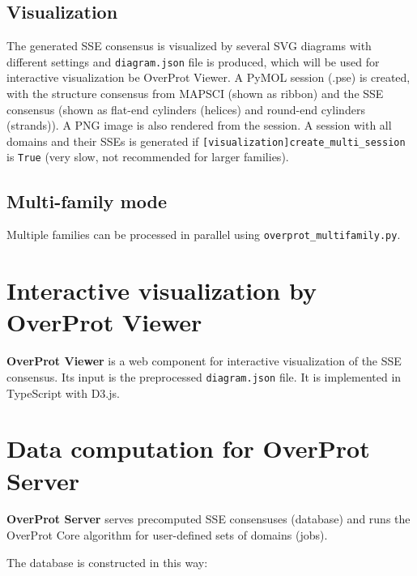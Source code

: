\documentclass[12pt,draft]{article}
\let\oldtexttt\texttt
\renewcommand{\texttt}[1]{\textcolor{CodeColor}{\oldtexttt{#1}}}
\begin{document}
\hypertarget{visualization}{%
\subsection{Visualization}\label{visualization}}

The generated SSE consensus is visualized by several SVG diagrams with
different settings and \texttt{diagram.json} file is produced, which
will be used for interactive visualization be OverProt Viewer. A PyMOL
session (.pse) is created, with the structure consensus from MAPSCI
(shown as ribbon) and the SSE consensus (shown as flat-end cylinders
(helices) and round-end cylinders (strands)). A PNG image is also
rendered from the session. A session with all domains and their SSEs is
generated if \texttt{{[}visualization{]}create\_multi\_session} is
\texttt{True} (very slow, not recommended for larger families).

\hypertarget{multi-family-mode}{%
\subsection{Multi-family mode}\label{multi-family-mode}}

Multiple families can be processed in parallel using
\texttt{overprot\_multifamily.py}.

\hypertarget{interactive-visualization-by-overprot-viewer}{%
\section{Interactive visualization by OverProt
Viewer}\label{interactive-visualization-by-overprot-viewer}}

\textbf{OverProt Viewer} is a web component for interactive
visualization of the SSE consensus. Its input is the preprocessed
\texttt{diagram.json} file. It is implemented in TypeScript with D3.js.

\hypertarget{data-computation-for-overprot-server}{%
\section{Data computation for OverProt
Server}\label{data-computation-for-overprot-server}}

\textbf{OverProt Server} serves precomputed SSE consensuses (database)
and runs the OverProt Core algorithm for user-defined sets of domains
(jobs).

The database is constructed in this way:
\end{document}

